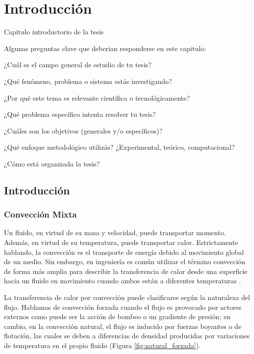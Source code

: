 \chapter{Introducción}
\label{cap:intro}

Capitulo introductorio de la tesis


Algunas preguntas clave que deberian responderse en este capitulo:

¿Cuál es el campo general de estudio de tu tesis?

¿Qué fenómeno, problema o sistema estás investigando?

¿Por qué este tema es relevante científica o tecnológicamente?

¿Qué problema específico intenta resolver tu tesis?

¿Cuáles son los objetivos (generales y/o específicos)?

¿Qué enfoque metodológico utilizás? ¿Experimental, teórico, computacional?

¿Cómo está organizada la tesis?

\newpage
\section{Introducción}

\subsection*{Convección Mixta}

Un fluido, en virtud de su masa y velocidad, puede transportar momento. Además, en virtud de su temperatura, puede transportar calor. Estrictamente hablando, la convección es el transporte de energía debido al movimiento global de un medio. Sin embargo, en ingeniería es común utilizar el término convección de forma más amplia para describir la transferencia de calor desde una superficie hacia un fluido en movimiento cuando ambos están a diferentes temperaturas \cite{cengelheat,incropera}. 

La transferencia de calor por convección puede clasificarse según la naturaleza del flujo. Hablamos de convección forzada cuando el flujo es provocado por actores externos como puede ser la acción de bombeo o un gradiente de presión; en cambio, en la convección natural, el flujo es inducido por fuerzas boyantes o de flotación, las cuales se deben a diferencias de densidad producidas por variaciones de temperatura en el propio fluido (Figura \ref{fig:natural_forzada}).

